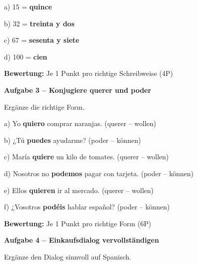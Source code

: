 \documentclass[11pt, a4paper]{article}
\newcommand{\fachfarbe}{spanisch}
\newcommand{\punktebox}[1]{\hfill\fbox{\small \_/#1}}
\newcommand{\lsg}[1]{\textcolor{loesung}{\textbf{#1}}}
\newenvironment{aufgabe}[1]{%
    \needspace{5\baselineskip}%
    \nopagebreak[4]%
    \vspace{10pt}
    \noindent\textbf{\textcolor{\fachfarbe}{Aufgabe #1}}
    \nopagebreak[4]%
    \vspace{5pt}
    \nopagebreak[4]%
    \begin{list}{}{\leftmargin=0pt}
    \item[]
}{%
    \end{list}
}
\newcommand{\es}[1]{\textcolor{\fachfarbe}{\textbf{#1}}}
\begin{document}
\noindent
a) 15 = \lsg{quince}

\vspace{0.8em}

\noindent
b) 32 = \lsg{treinta y dos}

\vspace{0.8em}

\noindent
c) 67 = \lsg{sesenta y siete}

\vspace{0.8em}

\noindent
d) 100 = \lsg{cien}

\textbf{Bewertung:} Je 1 Punkt pro richtige Schreibweise (4P)

\vspace{15pt}

\begin{aufgabe}{3 -- Konjugiere \es{querer} und \es{poder}}
Ergänze die richtige Form. \punktebox{6}
\end{aufgabe}

\noindent
a) Yo \lsg{quiero} comprar naranjas. \hfill (querer -- wollen)

\vspace{0.8em}

\noindent
b) ¿Tú \lsg{puedes} ayudarme? \hfill (poder -- können)

\vspace{0.8em}

\noindent
c) María \lsg{quiere} un kilo de tomates. \hfill (querer -- wollen)

\vspace{0.8em}

\noindent
d) Nosotros no \lsg{podemos} pagar con tarjeta. \hfill (poder -- können)

\vspace{0.8em}

\noindent
e) Ellos \lsg{quieren} ir al mercado. \hfill (querer -- wollen)

\vspace{0.8em}

\noindent
f) ¿Vosotros \lsg{podéis} hablar español? \hfill (poder -- können)

\textbf{Bewertung:} Je 1 Punkt pro richtige Form (6P)

\vspace{15pt}

\begin{aufgabe}{4 -- Einkaufsdialog vervollständigen}
Ergänze den Dialog sinnvoll auf Spanisch. \punktebox{6}
\end{aufgabe}
\end{document}
